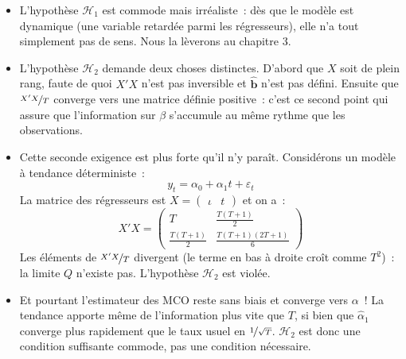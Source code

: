 \documentclass[10pt]{beamer}
\begin{document}
\begin{notes}

  \begin{itemize}

  \item L'hypothèse $\mathcal H_1$ est commode mais irréaliste~: dès que le modèle est
    dynamique (une variable retardée parmi les régresseurs), elle n'a tout simplement
    pas de sens. Nous la lèverons au chapitre 3.\newline

  \item L'hypothèse $\mathcal H_2$ demande deux choses distinctes. D'abord que $X$ soit
    de plein rang, faute de quoi $X'X$ n'est pas inversible et $\hat{\mathbf b}$ n'est
    pas défini. Ensuite que $\nicefrac{X'X}{T}$ converge vers une matrice définie
    positive~: c'est ce second point qui assure que l'information sur $\beta$
    s'accumule au même rythme que les observations.\newline

  \item Cette seconde exigence est plus forte qu'il n'y paraît. Considérons un modèle à
    tendance déterministe~:
    \[
      y_t = \alpha_0 + \alpha_1 t + \varepsilon_t
    \]
    La matrice des régresseurs est $X = \begin{pmatrix} \iota & t\end{pmatrix}$ et on a~:
    \[
      X'X =
      \begin{pmatrix}
        T                 & \frac{T(T+1)}{2}\\[2pt]
        \frac{T(T+1)}{2}  & \frac{T(T+1)(2T+1)}{6}
      \end{pmatrix}
    \]
    Les éléments de $\nicefrac{X'X}{T}$ divergent (le terme en bas à droite croît
    comme $T^2$)~: la limite $Q$ n'existe pas. L'hypothèse $\mathcal H_2$ est
    violée.\newline

  \item Et pourtant l'estimateur des MCO reste sans biais et converge vers $\alpha$~! La
    tendance apporte même de l'information \guillemotleft plus vite \guillemotright{}
    que $T$, si bien que $\hat\alpha_1$ converge plus rapidement que le taux usuel
    en $\nicefrac{1}{\sqrt T}$. $\mathcal H_2$ est donc une condition suffisante
    commode, pas une condition nécessaire.

  \end{itemize}

\end{notes}
\end{document}
